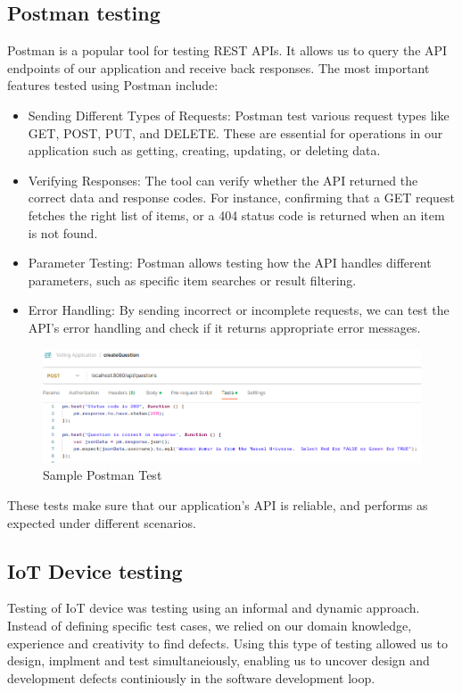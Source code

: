 \subsection{Postman testing}
Postman is a popular tool for testing REST APIs. It allows us to query the API endpoints of our application and receive back responses. The most important features tested using Postman include:

\begin{itemize}
    \item {Sending Different Types of Requests}: Postman test various request types like GET, POST, PUT, and DELETE. These are essential for operations in our application such as getting, creating, updating, or deleting data.
    \item {Verifying Responses}: The tool can verify whether the API returned the correct data and response codes. For instance, confirming that a GET request fetches the right list of items, or a 404 status code is returned when an item is not found.
    \item {Parameter Testing}: Postman allows testing how the API handles different parameters, such as specific item searches or result filtering.
    \item {Error Handling}: By sending incorrect or incomplete requests, we can test the API's error handling and check if it returns appropriate error messages.
\end{itemize}

\begin{figure}[h]
  \centering
  \includegraphics[scale=0.65]{figs/create_question_test.png}
  \caption{Sample Postman Test}
  \label{fig:appFlow}
\end{figure}

\noindent These tests make sure that our application's API is reliable, and performs as expected under different scenarios.

\subsection{IoT Device testing}

Testing of IoT device was testing using an informal and dynamic approach.  Instead of defining specific test cases, we relied on our domain knowledge, experience and creativity to find defects.  Using this type of testing allowed us to design, implment and test simultaneiously, enabling us to uncover design and development defects continiously in the software development loop. 